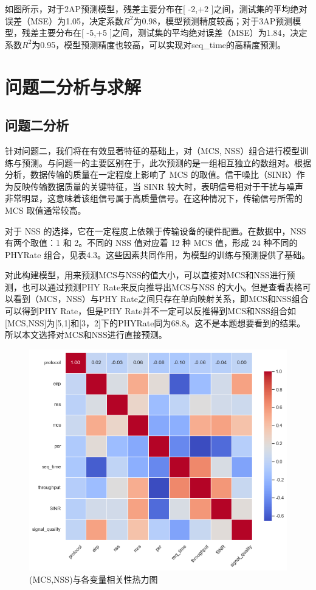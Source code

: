 \documentclass[bwprint]{gmcmthesis}
\begin{document}
如图所示，对于2AP预测模型，残差主要分布在[ -2,+2 ]之间，测试集的平均绝对误差（MSE）为1.05，决定系数${R}^{2}$为0.98，模型预测精度较高；对于3AP预测模型，残差主要分布在[ -5,+5 ]之间，测试集的平均绝对误差（MSE）为1.84，决定系数${R}^{2}$为0.95，模型预测精度也较高，可以实现对seq\_time的高精度预测。



\section{问题二分析与求解}
\subsection{问题二分析}
针对问题二，我们将在有效显著特征的基础上，对（MCS, NSS）组合进行模型训练与预测。与问题一的主要区别在于，此次预测的是一组相互独立的数组对。根据分析，数据传输的质量在一定程度上影响了 MCS 的取值。信干噪比（SINR）作为反映传输数据质量的关键特征，当 SINR 较大时，表明信号相对于干扰与噪声非常明显，这意味着该组信号属于高质量信号。在这种情况下，传输信号所需的 MCS 取值通常较高。

对于 NSS 的选择，它在一定程度上依赖于传输设备的硬件配置。在数据中，NSS 有两个取值：1 和 2。不同的 NSS 值对应着 12 种 MCS 值，形成 24 种不同的 PHYRate 组合，见表4.3。这些因素共同作用，为模型的训练与预测提供了基础。



对此构建模型，用来预测MCS与NSS的值大小，可以直接对MCS和NSS进行预测，也可以通过预测PHY Rate来反向推导出MCS与NSS 的大小。但是查看表格可以看到（MCS，NSS）与PHY Rate之间只存在单向映射关系，即MCS和NSS组合可以得到PHY Rate，但是PHY Rate并不一定可以反推得到MCS和NSS组合如[MCS,NSS]为[5,1]和[3，2]下的PHYRate同为68.8。这不是本题想要看到的结果。所以本文选择对MCS和NSS进行直接预测。


\begin{figure}[H]
	\centering
	\includegraphics[width=0.7\linewidth]{figures/问题2热力图}
	\caption{(MCS,NSS)与各变量相关性热力图}
	\label{fig:2}
\end{figure}
\end{document}
